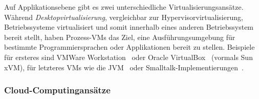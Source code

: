 Auf Applikationsebene gibt es zwei unterschiedliche
Virtualisierungsansätze. Während \emph{Desktopvirtualisierung},
vergleichbar zur Hypervisorvirtualisierung, Betriebssysteme
virtualisiert und somit innerhalb eines anderen Betriebssystem bereit
stellt, haben Prozess-\acp{VM} das Ziel, eine Ausführungsumgebung für
bestimmte Programmiersprachen oder Applikationen bereit zu stellen.
Beispiele für ersteres sind VMWare
Workstation~\cite{VMWare-Inc:VMware-Workstat} oder Oracle
VirtualBox~\cite{Oracle-Corporation:VirtualBox} (vormals Sun xVM), für
letzteres \acp{VM} wie die
JVM~\cite{Sun-Developer-Network2003:The-Java-Virtua} oder
Smalltalk-Implementierungen~\cite{ansiSmalltalk}.

\subsubsection{Cloud-Computingansätze}


